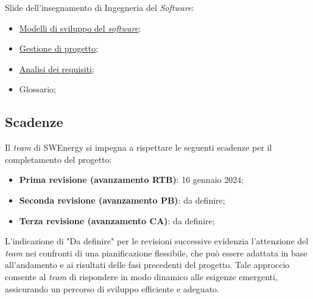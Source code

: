 Slide dell'insegnamento di Ingegneria del \textit{Software}:
\begin{itemize}
	\item \href{https://www.math.unipd.it/~tullio/IS-1/2023/Dispense/T3.pdf}
	      {Modelli di sviluppo del \textit{software}};
	\item \href{https://www.math.unipd.it/~tullio/IS-1/2023/Dispense/T4.pdf}
	      {Gestione di progetto};
	\item \href{https://www.math.unipd.it/~tullio/IS-1/2023/Dispense/T5.pdf}
	      {Analisi dei requisiti};
	\item Glossario;
\end{itemize}

\subsection{Scadenze}
Il \textit{team} di SWEnergy si impegna a rispettare le seguenti scadenze per il
completamento del progetto:
\begin{itemize}
	\item \textbf{Prima revisione (avanzamento RTB)}: 16 gennaio 2024;
	\item \textbf{Seconda revisione (avanzamento PB)}: da definire;
	\item \textbf{Terza revisione (avanzamento CA)}: da definire;
\end{itemize}

L'indicazione di "Da definire" per le revisioni successive evidenzia l'attenzione
del \textit{team} nei confronti di una pianificazione flessibile, che può essere
adattata in base all'andamento e ai risultati delle fasi precedenti del progetto.
Tale approccio consente al \textit{team} di rispondere in modo dinamico alle esigenze emergenti,
assicurando un percorso di sviluppo efficiente e adeguato.
